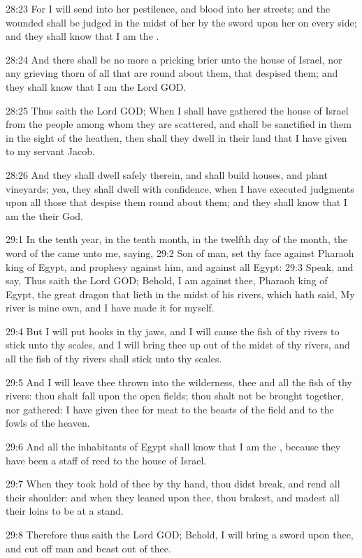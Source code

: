 28:23 For I will send into her pestilence, and blood into her streets; and the wounded shall be judged in the midst of her by the sword upon her on every side; and they shall know that I am the \LORD.

28:24 And there shall be no more a pricking brier unto the house of Israel, nor any grieving thorn of all that are round about them, that despised them; and they shall know that I am the Lord GOD.

28:25 Thus saith the Lord GOD; When I shall have gathered the house of Israel from the people among whom they are scattered, and shall be sanctified in them in the sight of the heathen, then shall they dwell in their land that I have given to my servant Jacob.

28:26 And they shall dwell safely therein, and shall build houses, and plant vineyards; yea, they shall dwell with confidence, when I have executed judgments upon all those that despise them round about them; and they shall know that I am the \LORD their God.

29:1 In the tenth year, in the tenth month, in the twelfth day of the month, the word of the \LORD came unto me, saying, 29:2 Son of man, set thy face against Pharaoh king of Egypt, and prophesy against him, and against all Egypt: 29:3 Speak, and say, Thus saith the Lord GOD; Behold, I am against thee, Pharaoh king of Egypt, the great dragon that lieth in the midst of his rivers, which hath said, My river is mine own, and I have made it for myself.

29:4 But I will put hooks in thy jaws, and I will cause the fish of thy rivers to stick unto thy scales, and I will bring thee up out of the midst of thy rivers, and all the fish of thy rivers shall stick unto thy scales.

29:5 And I will leave thee thrown into the wilderness, thee and all the fish of thy rivers: thou shalt fall upon the open fields; thou shalt not be brought together, nor gathered: I have given thee for meat to the beasts of the field and to the fowls of the heaven.

29:6 And all the inhabitants of Egypt shall know that I am the \LORD, because they have been a staff of reed to the house of Israel.

29:7 When they took hold of thee by thy hand, thou didst break, and rend all their shoulder: and when they leaned upon thee, thou brakest, and madest all their loins to be at a stand.

29:8 Therefore thus saith the Lord GOD; Behold, I will bring a sword upon thee, and cut off man and beast out of thee.

